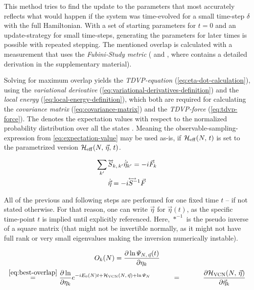 This method tries to find the update to the parameters that most accurately reflects what would happen if the system was time-evolved for a small time-step $\delta$ with the full Hamiltonian.
With a set of starting parameters for $t=0$ and an update-strategy for small time-steps, generating the parameters for later times is possible with repeated stepping.
The mentioned overlap is calculated with a measurement that uses the \emph{Fubini-Study metric} (\cite{variationalClassicalNetworksPaper} and \cite{probabilitySamplingRequirementVCN}, where \cite{probabilitySamplingRequirementVCN} contains a detailed derivation in the supplementary material).

Solving for maximum overlap yields the \emph{TDVP-equation} (\autoref{eq:eta-dot-calculation}), using the \emph{variational derivative} (\autoref{eq:variational-derivatives-definition}) and the \emph{local energy} (\autoref{eq:local-energy-definition}), which both are required for calculating the \emph{covariance matrix} (\autoref{eq:covariance-matrix}) and the \emph{TDVP-force} (\autoref{eq:tdvp-force}).
The \etaExpectationVal{\ast} denotes the expectation values with respect to the normalized probability distribution over all the states  \cite{probabilitySamplingRequirementVCN}.
Meaning the observable-sampling-expression from \autoref{eq:expectation-value} may be used as-is, if $\HeffOft$ is set to the parametrized version $\HeffOft[N,\,\vec{\eta}]$.

\begin{equation}
    \label{eq:eta-dot-calculation}
    \begin{gathered}
        \lsum[k'] \matvec{S}_{k,\, k'} \dot{\vec{\eta}}_{k'} = -i \vec{F}_k\\
        \dot{\vec{\eta}} = -i {\matvec{S^{-1}}} \vec{F}
    \end{gathered}
\end{equation}

All of the previous and following steps are performed for one fixed time $t$ -- if not stated otherwise.
For that reason, one can write $\vec{\eta}$ for $\vec{\eta}(t)$, as the specific time-point $t$ is implied until explicitly referenced.
Here, $\ast^{-1}$ is the pseudo inverse of a square matrix (that might not be invertible normally, as it might not have full rank or very small eigenvalues making the inversion numerically instable).

\begin{equation}
    \label{eq:variational-derivatives-definition}
    \begin{gathered}
        O_{k}(N) = \frac{\partial \ln \psiEta{N,\,\vec{\eta}}{t}}{\partial \eta_k}\\
        \stackrel{\ref{eq:best-overlap}}{=} \frac{\partial \ln }{\partial \eta_k} e^{-i E_0(N) t + \Hvcn{\vec{\eta}} + \ln \psiN} 
        \stackrel{\phantom{\ref{eq:best-overlap}}}{=} 
        \frac{\partial \Hvcn{\vec{\eta}} }{\partial \vec{\eta}_k} 
    \end{gathered}
\end{equation}

